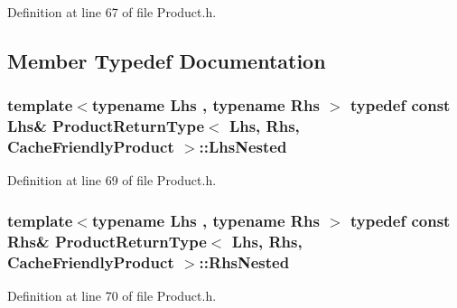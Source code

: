 Definition at line 67 of file Product.\-h.



\subsection{Member Typedef Documentation}
\hypertarget{struct_product_return_type_3_01_lhs_00_01_rhs_00_01_cache_friendly_product_01_4_a6b52852c9c4b8b71201934ae33a8e6b3}{
\subsubsection[{Lhs\-Nested}]{\setlength{\rightskip}{0pt plus 5cm}template$<$typename Lhs , typename Rhs $>$ typedef const Lhs\& {\bf Product\-Return\-Type}$<$ Lhs, Rhs, {\bf Cache\-Friendly\-Product} $>$\-::{\bf Lhs\-Nested}}}\label{struct_product_return_type_3_01_lhs_00_01_rhs_00_01_cache_friendly_product_01_4_a6b52852c9c4b8b71201934ae33a8e6b3}


Definition at line 69 of file Product.\-h.

\hypertarget{struct_product_return_type_3_01_lhs_00_01_rhs_00_01_cache_friendly_product_01_4_a8fa0613d70d5dfc2abc4ef33c3c36d1c}{
\subsubsection[{Rhs\-Nested}]{\setlength{\rightskip}{0pt plus 5cm}template$<$typename Lhs , typename Rhs $>$ typedef const Rhs\& {\bf Product\-Return\-Type}$<$ Lhs, Rhs, {\bf Cache\-Friendly\-Product} $>$\-::{\bf Rhs\-Nested}}}\label{struct_product_return_type_3_01_lhs_00_01_rhs_00_01_cache_friendly_product_01_4_a8fa0613d70d5dfc2abc4ef33c3c36d1c}


Definition at line 70 of file Product.\-h.

